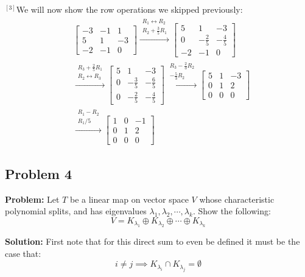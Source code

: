 \documentclass{article}
\begin{document}
$\phantom{}^{[3]}$We will now show the row operations we skipped previously:
\begin{align*} 
  &\left[\begin{array}{rrr}
    -3&-1&1\\5&1&-3\\-2&-1&0
    \end{array} \right]
    \xrightarrow{\substack{R_1\leftrightarrow R_2\\R_2+\frac{3}{5}R_1}} 
    \left[\begin{array}{rrr}
      5&1&-3\\
      0&-\frac{2}{5}&-\frac{4}{5}\\
      -2&-1&0
    \end{array} \right]\\
    &\xrightarrow{\substack{R_3+\frac{2}{5}R_1\\ R_2\leftrightarrow R_3}} 
    \left[\begin{array}{rrr}
      5&1&-3\\
      0&-\frac{3}{5}&-\frac{6}{5}\\
      0&-\frac{2}{5}&-\frac{4}{5}
    \end{array} \right]
    \xrightarrow{\substack{R_3-\frac{2}{3}R_2\\ -\frac{5}{3}R_2}}
    \left[\begin{array}{rrr} 
      5&1&-3\\
      0&1&2\\
      0&0&0
    \end{array} \right]\\
    &\xrightarrow{\substack{R_1-R_2\\ R_1/5}}
    \left[\begin{array}{rrr} 
      1&0&-1\\
      0&1&2\\
      0&0&0
    \end{array} \right]
\end{align*}
\newpage

\subsection*{Problem 4}
\noindent\textbf{Problem:} Let $T$ be a linear map on vector space $V$ whose characteristic polynomial splits, and has eigenvalues $\lambda_1,\lambda_2,\cdots,\lambda_k$. Show the following:
$$V=K_{\lambda_1}\oplus K_{\lambda_2}\oplus\cdots\oplus K_{\lambda_k}$$
\smallskip

\noindent\textbf{Solution:} First note that for this direct sum to even be defined it must be the case that:
$$i\not=j\implies K_{\lambda_i}\cap K_{\lambda_j}=\emptyset$$
\end{document}

